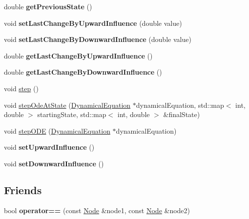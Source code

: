 \begin{DoxyCompactItemize}
\item 
double {\bfseries get\+Previous\+State} ()\hypertarget{classNode_a6aa927856c01c3e3849fb79db03a4232}{}\label{classNode_a6aa927856c01c3e3849fb79db03a4232}

\item 
void {\bfseries set\+Last\+Change\+By\+Upward\+Influence} (double value)\hypertarget{classNode_a0f670944bb563ea9e52e7c730b0ca6fa}{}\label{classNode_a0f670944bb563ea9e52e7c730b0ca6fa}

\item 
void {\bfseries set\+Last\+Change\+By\+Downward\+Influence} (double value)\hypertarget{classNode_adf51e24a764fe10fb03ba2c6697affc3}{}\label{classNode_adf51e24a764fe10fb03ba2c6697affc3}

\item 
double {\bfseries get\+Last\+Change\+By\+Upward\+Influence} ()\hypertarget{classNode_ad3c7b4bfda791bffef97323599f5d29a}{}\label{classNode_ad3c7b4bfda791bffef97323599f5d29a}

\item 
double {\bfseries get\+Last\+Change\+By\+Downward\+Influence} ()\hypertarget{classNode_a5b2ee3a29400983f540c0dd4bf5d6d65}{}\label{classNode_a5b2ee3a29400983f540c0dd4bf5d6d65}

\item 
void \hyperlink{classNode_aeca7ef58472c76e9e751226abc2f6454}{step} ()
\item 
void \hyperlink{classNode_aeb2d389fbdfff8a2b4df8da2293b0e0d}{step\+Ode\+At\+State} (\hyperlink{classDynamicalEquation}{Dynamical\+Equation} $\ast$dynamical\+Equation, std\+::map$<$ int, double $>$ starting\+State, std\+::map$<$ int, double $>$ \&final\+State)
\item 
void \hyperlink{classNode_afe30b7fc1388bb03bf2db231cc1c8656}{step\+O\+DE} (\hyperlink{classDynamicalEquation}{Dynamical\+Equation} $\ast$dynamical\+Equation)
\item 
void {\bfseries set\+Upward\+Influence} ()\hypertarget{classNode_a905952508ade253c1e8c826ce4ab5434}{}\label{classNode_a905952508ade253c1e8c826ce4ab5434}

\item 
void {\bfseries set\+Downward\+Influence} ()\hypertarget{classNode_acf0d5159faf93928dbfbe654feedd9a4}{}\label{classNode_acf0d5159faf93928dbfbe654feedd9a4}

\end{DoxyCompactItemize}
\subsection*{Friends}
\begin{DoxyCompactItemize}
\item 
bool {\bfseries operator==} (const \hyperlink{classNode}{Node} \&node1, const \hyperlink{classNode}{Node} \&node2)\hypertarget{classNode_aa6ca4e78d2001f10e20ffcf962ef42cb}{}\label{classNode_aa6ca4e78d2001f10e20ffcf962ef42cb}

\end{DoxyCompactItemize}


